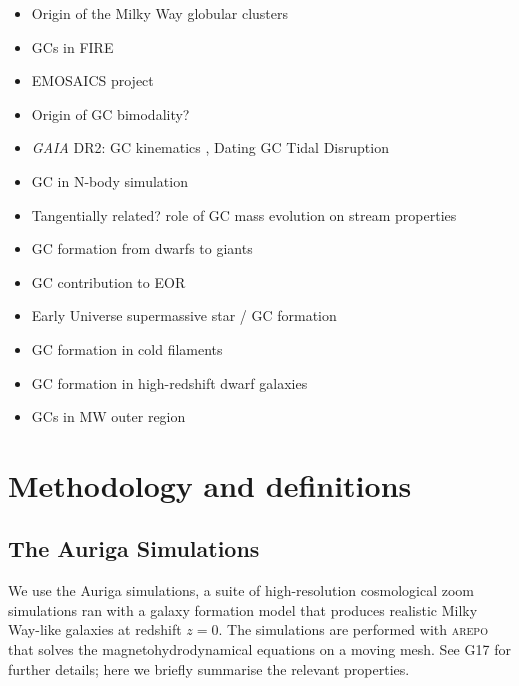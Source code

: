 \documentclass[a4paper,fleqn,usenatbib]{mnras}
\begin{document}
\begin{itemize}
\item Origin of the Milky Way globular clusters \citep{2017MNRAS.465.3622R}
\item GCs in FIRE \citep{2018MNRAS.474.4232K}
\item EMOSAICS project \citep{2018MNRAS.475.4309P}
\item Origin of GC bimodality? \citep{2018MNRAS.479..200F}
\item \textit{GAIA} DR2: GC kinematics \citep{2018A&A...616A..12G}, Dating GC Tidal Disruption \citep{2018ApJ...859L..13B}
\item GC in N-body simulation \citep{2018ApJ...861...69C}
\item Tangentially related? role of GC mass evolution on stream properties \citep{2018MNRAS.474.2479B}
\item GC formation from dwarfs to giants \citep{2018MNRAS.480.2343C}
\item GC contribution to EOR \citep{2018MNRAS.479..332B}
\item Early Universe supermassive star / GC formation \citep{2018MNRAS.478.2461G}
\item GC formation in cold filaments \citep{2018ApJ...861..148M}
\item GC formation in high-redshift dwarf galaxies \citep{2018MNRAS.477..480Z}
\item GCs in MW outer region \citep{2017arXiv170804542P}
\end{itemize}

\section{Methodology and definitions}
\label{sec:methods}
\subsection{The Auriga Simulations}
\label{sec:auriga}
We use the Auriga \citep[][hereafter G17]{2017MNRAS.467..179G} simulations, a suite of high-resolution cosmological zoom simulations ran with a galaxy formation model that produces realistic Milky Way-like galaxies at redshift $z=0$. The simulations are performed with \textsc{arepo} \citep{2010MNRAS.401..791S, 2016MNRAS.455.1134P} that solves the magnetohydrodynamical equations on a moving mesh. See G17 for further details; here we briefly summarise the relevant properties.
\end{document}

